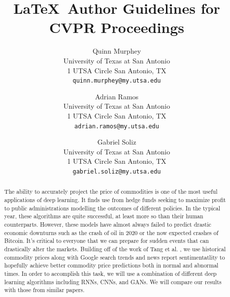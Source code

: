 \documentclass[final]{cvpr}
\begin{document}
\title{\LaTeX\ Author Guidelines for CVPR Proceedings}

\author{Quinn Murphey\\
University of Texas at San Antonio\\
1 UTSA Circle San Antonio, TX\\
{\tt\small quinn.murphey@my.utsa.edu}
\and
Adrian Ramos\\
University of Texas at San Antonio\\
1 UTSA Circle San Antonio, TX\\
{\tt\small adrian.ramos@my.utsa.edu}

\and
Gabriel Soliz\\
University of Texas at San Antonio\\
1 UTSA Circle San Antonio, TX\\
{\tt\small gabriel.soliz@my.utsa.edu}
}

\maketitle


\begin{abstract}
    The ability to accurately project the price of commodities is one of the
    most useful applications of deep learning. It finds use from hedge funds
    seeking to maximize profit to public administrations modelling the outcomes
    of different policies. In the typical year, these algorithms are quite 
    successful, at least more so than their human counterparts. However, these
    models have almost always failed to predict drastic economic downturns such
    as the crash of oil in 2020 or the now expected crashes of Bitcoin.
    It’s critical to everyone that we can prepare for sudden events that can
    drastically alter the markets. Building off of the work of Tang et al.
    \cite{tang}, we use historical commodity prices along with Google
    search trends and news report sentimentatlity to hopefully achieve better
    commodity price predictions both in normal and abnormal times. In order
    to accomplish this task, we will use a combination of different deep
    learning algorithms including RNNs, CNNs, and GANs. We will compare our
    results with those from similar papers.
\end{abstract}
\end{document}
